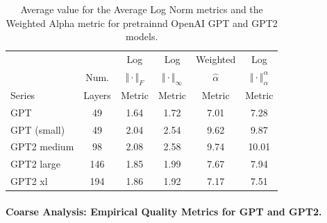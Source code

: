 
\begin{table}[t]
\small
\begin{center}
\begin{tabular}{|p{0.75in}|c|c|c|c|c|}
\hline
        &        & Log                   & Log                        & Weighted       & Log                                 \\
        & Num.   & $\Vert\cdot\Vert_{F}$ & $\Vert\cdot\Vert_{\infty}$ & $\hat{\alpha}$ & $\Vert\cdot\Vert^{\alpha}_{\alpha}$ \\
 Series & Layers & Metric                & Metric                     & Metric         & Metric                              \\
\hline
GPT & 49 & 1.64  & 1.72 & 7.01 & 7.28 \\
GPT (small) & 49 & 2.04  & 2.54& 9.62 & 9.87 \\
GPT2 medium & 98 & 2.08 & 2.58& 9.74 & 10.01 \\
GPT2 large & 146 & 1.85 & 1.99& 7.67 & 7.94 \\
GPT2 xl & 194 & 1.86 & 1.92 & 7.17 & 7.51 \\
\hline
\end{tabular}
\end{center}
\caption{Average value for the Average Log Norm metrics and the Weighted Alpha metric for pretrainnd OpenAI GPT and GPT2 models.  }
\label{table:nlp}
\end{table}


\paragraph{Coarse Analysis: Empirical Quality Metrics for GPT and GPT2.}

